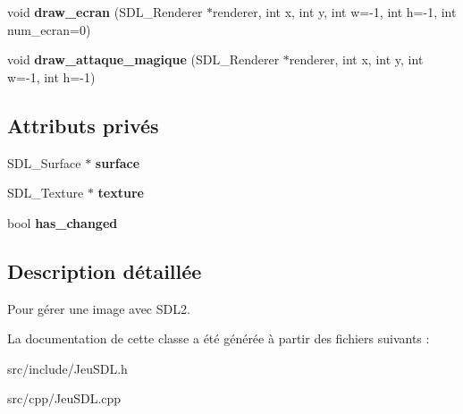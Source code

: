 \begin{DoxyCompactItemize}
\item 
\hypertarget{classImage_ab4569b90ca28e91b4379419a2852d3b2}{void {\bfseries draw\+\_\+ecran} (S\+D\+L\+\_\+\+Renderer $\ast$renderer, int x, int y, int w=-\/1, int h=-\/1, int num\+\_\+ecran=0)}\label{classImage_ab4569b90ca28e91b4379419a2852d3b2}

\item 
\hypertarget{classImage_a02ee23ace81628aa846b533252fb9e0f}{void {\bfseries draw\+\_\+attaque\+\_\+magique} (S\+D\+L\+\_\+\+Renderer $\ast$renderer, int x, int y, int w=-\/1, int h=-\/1)}\label{classImage_a02ee23ace81628aa846b533252fb9e0f}

\end{DoxyCompactItemize}
\subsection*{Attributs privés}
\begin{DoxyCompactItemize}
\item 
\hypertarget{classImage_ac1d365143f4f5ee59f318977ad6d798b}{S\+D\+L\+\_\+\+Surface $\ast$ {\bfseries surface}}\label{classImage_ac1d365143f4f5ee59f318977ad6d798b}

\item 
\hypertarget{classImage_a4f44588a7d341e02dae82e2de94dfad6}{S\+D\+L\+\_\+\+Texture $\ast$ {\bfseries texture}}\label{classImage_a4f44588a7d341e02dae82e2de94dfad6}

\item 
\hypertarget{classImage_ab4cb83faeecef0cfb2773813c4757b45}{bool {\bfseries has\+\_\+changed}}\label{classImage_ab4cb83faeecef0cfb2773813c4757b45}

\end{DoxyCompactItemize}


\subsection{Description détaillée}
Pour gérer une image avec S\+D\+L2. 

La documentation de cette classe a été générée à partir des fichiers suivants \+:\begin{DoxyCompactItemize}
\item 
src/include/Jeu\+S\+D\+L.\+h\item 
src/cpp/Jeu\+S\+D\+L.\+cpp\end{DoxyCompactItemize}
